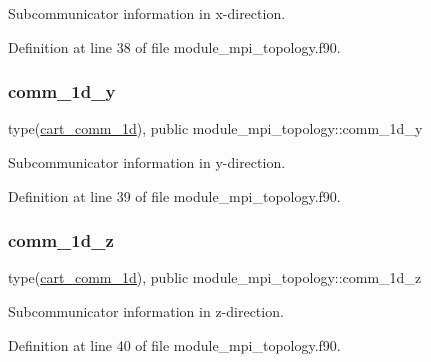 Subcommunicator information in x-\/direction. 



Definition at line 38 of file module\+\_\+mpi\+\_\+topology.\+f90.

\mbox{\label{namespacemodule__mpi__topology_aa3b66781881f19eec6cfe359031972a9}} 
\subsubsection{\texorpdfstring{comm\_1d\_y}{comm\_1d\_y}}
{\footnotesize\ttfamily type(\mbox{\hyperlink{structmodule__mpi__topology_1_1cart__comm__1d}{cart\+\_\+comm\+\_\+1d}}), public module\+\_\+mpi\+\_\+topology\+::comm\+\_\+1d\+\_\+y}



Subcommunicator information in y-\/direction. 



Definition at line 39 of file module\+\_\+mpi\+\_\+topology.\+f90.

\mbox{\label{namespacemodule__mpi__topology_a7e9fd4121125cf62c8259cee18ad3c2f}} 
\subsubsection{\texorpdfstring{comm\_1d\_z}{comm\_1d\_z}}
{\footnotesize\ttfamily type(\mbox{\hyperlink{structmodule__mpi__topology_1_1cart__comm__1d}{cart\+\_\+comm\+\_\+1d}}), public module\+\_\+mpi\+\_\+topology\+::comm\+\_\+1d\+\_\+z}



Subcommunicator information in z-\/direction. 



Definition at line 40 of file module\+\_\+mpi\+\_\+topology.\+f90.

\mbox{\label{namespacemodule__mpi__topology_a3e29ea1f3a4a2d1836560384361e8f8f}} 
